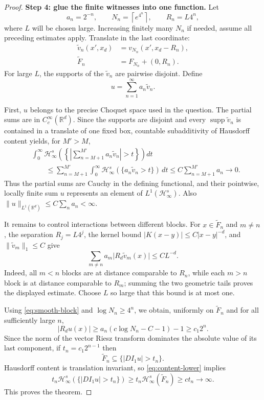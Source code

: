 \documentclass[11pt]{article}
\newcommand{\R}{\mathbb R}
\newcommand{\Hs}[1]{\mathcal H^{#1}_{\infty}}
\newcommand{\1}{\mathbf 1}
\begin{document}
\begin{proof}
\medskip
\noindent\textbf{Step 4: glue the finite witnesses into one function.}
Let
\[
 a_n=2^{-n},\qquad N_n=\left\lceil e^{4^n}\right\rceil,
 \qquad R_n=L4^n,
\]
where $L$ will be chosen large.  Increasing finitely many $N_n$ if needed,
assume all preceding estimates apply.  Translate in the last coordinate:
\begin{align*}
 \widetilde v_n(x',x_d)&=v_{N_n}(x',x_d-R_n),\\
 \widetilde F_n&=F_{N_n}+(0,R_n).
\end{align*}
For large $L$, the supports of the $\widetilde v_n$ are pairwise disjoint.
Define
\[
 u=\sum_{n=1}^{\infty}a_n\widetilde v_n.
\]

First, $u$ belongs to the precise Choquet space used in the question.  The
partial sums are in $C_c^\infty(\R^d)$.  Since the supports are disjoint and
every $\operatorname{supp}\widetilde v_n$ is contained in a translate of one
fixed box, countable subadditivity of Hausdorff content yields, for $M'>M$,
\begin{align*}
 &\int_0^\infty\Hs{s}
 \left(\left\{\left\lvert\sum_{n=M+1}^{M'}a_n\widetilde v_n\right\rvert
 >t\right\}\right)dt\\
 &\qquad\leq\sum_{n=M+1}^{M'}
 \int_0^\infty\Hs{s}(\{a_n\widetilde v_n>t\})\,dt
 \leq C\sum_{n=M+1}^{M'}a_n\longrightarrow0.
\end{align*}
Thus the partial sums are Cauchy in the defining functional, and their
pointwise, locally finite sum $u$ represents an element of $L^1(\Hs{s})$.
Also
$\lVert u\rVert_{L^1(\R^d)}\leq C\sum_na_n<\infty$.

It remains to control interactions between different blocks.  For
$x\in\widetilde F_n$ and $m\neq n$, the separation $R_j=L4^j$, the kernel
bound $\lvert K(x-y)\rvert\leq C\lvert x-y\rvert^{-d}$, and
$\lVert\widetilde v_m\rVert_1\leq C$ give
\[
 \sum_{m\neq n}a_m\lvert R_d\widetilde v_m(x)\rvert
 \leq C L^{-d}.
\]
Indeed, all $m<n$ blocks are at distance comparable to $R_n$, while each
$m>n$ block is at distance comparable to $R_m$; summing the two geometric
tails proves the displayed estimate.  Choose $L$ so large that this bound is
at most one.

Using \eqref{eq:smooth-block} and $\log N_n\geq4^n$, we obtain, uniformly on
$\widetilde F_n$ and for all sufficiently large $n$,
\[
 \lvert R_du(x)\rvert
 \geq a_n(c\log N_n-C-1)-1
 \geq c_1 2^n.
\]
Since the norm of the vector Riesz transform dominates the absolute value of
its last component, if $t_n=c_1 2^{n-1}$ then
\[
 \widetilde F_n\subseteq\{\lvert DI_1u\rvert>t_n\}.
\]
Hausdorff content is translation invariant, so \eqref{eq:content-lower}
implies
\[
 t_n\Hs{s}(\{\lvert DI_1u\rvert>t_n\})
 \geq t_n\Hs{s}(\widetilde F_n)
 \geq c t_n\longrightarrow\infty.
\]
This proves the theorem.
\end{proof}
\end{document}
